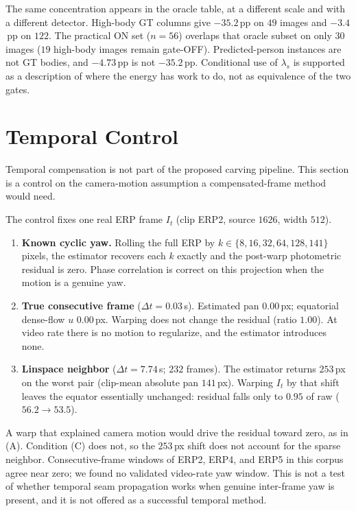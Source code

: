 \documentclass[conference,a4paper]{IEEEtran}
\begin{document}
The same concentration appears in the oracle table, at a
different scale and with a different detector. High-body GT
columns give $-35.2$\,pp on $49$ images and $-3.4$\,pp on $122$.
The practical ON set ($n=56$) overlaps that oracle subset on
only $30$ images ($19$ high-body images remain gate-OFF).
Predicted-person instances are not GT bodies, and $-4.73$\,pp is
not $-35.2$\,pp. Conditional use of $\lambda_s$ is supported as
a description of where the energy has work to do, not as
equivalence of the two gates.

\section{Temporal Control}
\label{sec:supp-temporal}

Temporal compensation is not part of the proposed carving
pipeline. This section is a control on the camera-motion
assumption a compensated-frame method would need.

The control fixes one real ERP frame $I_t$ (clip ERP2, source
$1626$, width $512$).

\begin{enumerate}
  \item[(A)] \textbf{Known cyclic yaw.}
  Rolling the full ERP by $k\in\{8,16,32,64,128,141\}$ pixels,
  the estimator recovers each $k$ exactly and the post-warp
  photometric residual is zero. Phase correlation is correct on
  this projection when the motion is a genuine yaw.

  \item[(B)] \textbf{True consecutive frame} ($\Delta t=0.03$\,s).
  Estimated pan $0.00$\,px; equatorial dense-flow $u$ $0.00$\,px.
  Warping does not change the residual (ratio $1.00$). At video
  rate there is no motion to regularize, and the estimator
  introduces none.

  \item[(C)] \textbf{Linspace neighbor}
  ($\Delta t=7.74$\,s; $232$ frames).
  The estimator returns $253$\,px on the worst pair (clip-mean
  absolute pan $141$\,px). Warping $I_t$ by that shift leaves
  the equator essentially unchanged: residual falls only to
  $0.95$ of raw ($56.2\rightarrow 53.5$).
\end{enumerate}

A warp that explained camera motion would drive the residual
toward zero, as in (A). Condition (C) does not, so the $253$\,px
shift does not account for the sparse neighbor. Consecutive-frame
windows of ERP2, ERP4, and ERP5 in this corpus agree near zero;
we found no validated video-rate yaw window. This is not a test
of whether temporal seam propagation works when genuine
inter-frame yaw is present, and it is not offered as a successful
temporal method.
\end{document}
